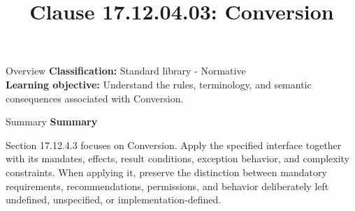 \documentclass[10pt,letterpaper]{article}
\title{Clause 17.12.04.03: Conversion}
\author{}
\date{}
\begin{document}
\maketitle
\begin{CornellOverviewBox}{Overview}
\textbf{Classification:} Standard library - Normative\\[2pt]
\textbf{Learning objective:} Understand the rules, terminology, and semantic consequences associated with Conversion.
\end{CornellOverviewBox}\begin{CornellSummaryBox}{Summary}
{\sffamily\bfseries\color{Accent} Summary}\par\vspace{3pt}Section 17.12.4.3 focuses on Conversion. Apply the specified interface together with its mandates, effects, result conditions, exception behavior, and complexity constraints. When applying it, preserve the distinction between mandatory requirements, recommendations, permissions, and behavior deliberately left undefined, unspecified, or implementation-defined.
\end{CornellSummaryBox}
\end{document}
